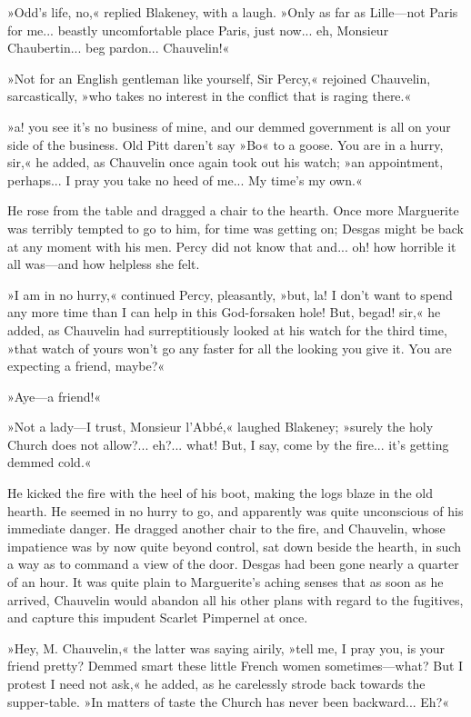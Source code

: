 »Odd's life, no,« replied Blakeney, with a laugh. »Only as far as Lille\allowbreak---\allowbreak not Paris for me... beastly uncomfortable place Paris, just now... eh, Monsieur Chaubertin... beg pardon... Chauvelin!«

»Not for an English gentleman like yourself, Sir Percy,« rejoined Chauvelin, sarcastically, »who takes no interest in the conflict that is raging there.«

»a! you see it's no business of mine, and our demmed government is all on your side of the business. Old Pitt daren't say »Bo« to a goose. You are in a hurry, sir,« he added, as Chauvelin once again took out his watch; »an appointment, perhaps... I pray you take no heed of me... My time's my own.«

He rose from the table and dragged a chair to the hearth. Once more Marguerite was terribly tempted to go to him, for time was getting on; Desgas might be back at any moment with his men. Percy did not know that and... oh! how horrible it all was\allowbreak---\allowbreak and how helpless she felt.

»I am in no hurry,« continued Percy, pleasantly, »but, la! I don't want to spend any more time than I can help in this God-forsaken hole! But, begad! sir,« he added, as Chauvelin had surreptitiously looked at his watch for the third time, »that watch of yours won't go any faster for all the looking you give it. You are expecting a friend, maybe?«

»Aye\allowbreak---\allowbreak a friend!«

»Not a lady\allowbreak---\allowbreak I trust, Monsieur l'Abbé,« laughed Blakeney; »surely the holy Church does not allow?... eh?... what! But, I say, come by the fire... it's getting demmed cold.«

He kicked the fire with the heel of his boot, making the logs blaze in the old hearth. He seemed in no hurry to go, and apparently was quite unconscious of his immediate danger. He dragged another chair to the fire, and Chauvelin, whose impatience was by now quite beyond control, sat down beside the hearth, in such a way as to command a view of the door. Desgas had been gone nearly a quarter of an hour. It was quite plain to Marguerite's aching senses that as soon as he arrived, Chauvelin would abandon all his other plans with regard to the fugitives, and capture this impudent Scarlet Pimpernel at once.

»Hey, M. Chauvelin,« the latter was saying airily, »tell me, I pray you, is your friend pretty? Demmed smart these little French women sometimes\allowbreak---\allowbreak what? But I protest I need not ask,« he added, as he carelessly strode back towards the supper-table. »In matters of taste the Church has never been backward... Eh?«

